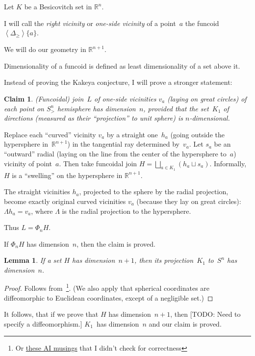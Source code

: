 \documentclass{amsart}
\newcommand{\supfun}[1]{\left\langle#1\right\rangle}
\newtheorem{lem}{Lemma}
\newtheorem{claim}{Claim}
\begin{document}
Let $K$ be a Besicovitch set in $\mathbb{R}^n$.

I will call the \emph{right vicinity} or \emph{one-si\-de vicinity} of a point~$a$ the funcoid~$\supfun{\Delta_{\geq}}\{a\}$.

We will do our geometry in $\mathbb{R}^{n+1}$.

Dimensionality of a funcoid is defined as least dimensionality of a set above it.

Instead of proving the Kakeya conjecture, I will prove a stronger statement:

\begin{claim}
(Funcoidal) join~$L$ of one-si\-de vicinities $v_a$ (laying on great circles) of each point on $S^n_{>}$ hemisphere has dimension~$n$, provided that the set~$K_1$ of directions (measured as their ``projection'' to unit sphere) is $n$-di\-men\-sio\-nal.
\end{claim}

Replace each ``curved'' vicinity $v_a$ by a straight one~$h_a$ (going outside the hypersphere in~$\mathbb{R}^{n+1}$) in the tangential ray determined by~$v_a$. Let $s_a$ be an ``outward'' radial (laying on the line from the center of the hypersphere to~$a$) vicinity of point~$a$. Then take funcoidal join $H=\bigsqcup_{a\in K_1}(h_a\sqcup s_a)$. Informally, $H$ is a ``swelling'' on the hypersphere in $\mathbb{R}^{n+1}$.

The straight vicinities $h_a$, projected to the sphere by the radial projection, become exactly original curved vicinities $v_a$ (because they lay on great circles): $\Lambda h_a=v_a$, where $\Lambda$ is the radial projection to the hypersphere.

Thus $L = \Phi_n H$.

If $\Phi_n H$ has dimension~$n$, then the claim is proved.

\begin{lem}
If a set $H$ has dimension~$n+1$, then its projection~$K_1$ to~$S^n$ has dimension~$n$.
\end{lem}

\begin{proof}
Follows from~\cite{189275}\footnote{Or \href{https://grok.com/share/bGVnYWN5_2e0aef8b-4309-420f-815c-a09d76ae97c1}{these AI musings}
that I didn't check for correctness}.
(We also apply that spherical coordinates are diffeomorphic to Euclidean coordinates, except of a negligible set.)
\end{proof}

It follows, that if we prove that $H$ has dimension~$n+1$, then [TODO: Need to specify a diffeomorphism.] $K_1$~has dimension~$n$ and our claim is proved.
\end{document}
